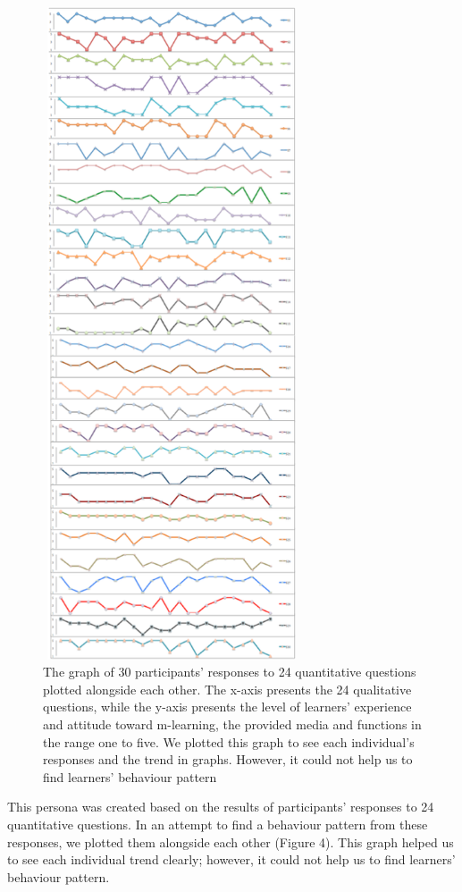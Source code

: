 \documentclass[a4paper,twoside]{article}
\begin{document}
\begin{figure}
\centering
\includegraphics[height=7.6in, width=3in]{fig4}
\caption{The graph of 30 participants' responses to 24 quantitative questions plotted alongside each other. The x-axis presents the 24 qualitative questions, while the y-axis presents the level of learners' experience and attitude toward m-learning, the provided media and functions in the range one to five. We plotted this graph to see each individual's responses and the trend in graphs. However, it could not help us to find learners' behaviour pattern}
\end{figure}

This persona was created based on the results of participants' responses to 24 quantitative questions. In an attempt to find a behaviour pattern from these responses, we plotted them alongside each other (Figure 4). This graph helped us to see each individual trend clearly; however, it could not help us to find learners' behaviour pattern. 
\end{document}
